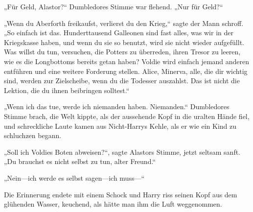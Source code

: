\begin{em}
„Für Geld, Alastor?“ Dumbledores Stimme war flehend. „Nur für Geld?“

„Wenn du Aberforth freikaufst, verlierst du den Krieg,“ sagte der Mann schroff. „So einfach ist das. Hunderttausend Galleonen sind fast alles, was wir in der Kriegskasse haben, und wenn du sie so benutzt, wird sie nicht wieder aufgefüllt. Was willst du tun, versuchen, die Potters zu überreden, ihren Tresor zu leeren, wie es die Longbottoms bereits getan haben? Voldie wird einfach jemand anderen entführen und eine weitere Forderung stellen. Alice, Minerva, alle, die dir wichtig sind, werden zur Zielscheibe, wenn du die Todesser auszahlst. Das ist nicht die Lektion, die du ihnen beibringen solltest.“

„Wenn ich das tue, werde ich niemanden haben. Niemanden.“ Dumbledores Stimme brach, die Welt kippte, als der aussehende Kopf in die uralten Hände fiel, und schreckliche Laute kamen aus Nicht-Harrys Kehle, als er wie ein Kind zu schluchzen begann.

„Soll ich Voldies Boten abweisen?“, sagte Alastors Stimme, jetzt seltsam sanft. „Du brauchst es nicht selbst zu tun, alter Freund.“

„Nein—ich werde es selbst sagen—ich muss—“
\end{em}

\later

Die Erinnerung endete mit einem Schock und Harry riss seinen Kopf aus dem glühenden Wasser, keuchend, als hätte man ihm die Luft weggenommen.

